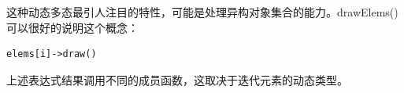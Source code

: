 这种动态多态最引人注目的特性，可能是处理异构对象集合的能力。drawElems()可以很好的说明这个概念：

\begin{lstlisting}[style=styleCXX]
elems[i]->draw()
\end{lstlisting}

上述表达式结果调用不同的成员函数，这取决于迭代元素的动态类型。


























